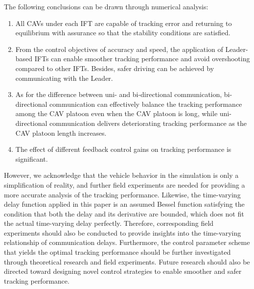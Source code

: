 \documentclass[a4paper]{cas-sc}
\begin{document}
The following conclusions can be drawn through numerical analysis:
\begin{enumerate}
  \item All CAVs under each IFT are capable of tracking error and returning to equilibrium with assurance so that the stability conditions are satisfied.
  \item From the control objectives of accuracy and speed, the application of Leader-based IFTs can enable smoother tracking performance and avoid overshooting compared to other IFTs. Besides, safer driving can be achieved by communicating with the Leader.
  \item As for the difference between uni- and bi-directional communication, bi-directional communication can effectively balance the tracking performance among the CAV platoon even when the CAV platoon is long, while uni-directional communication delivers deteriorating tracking performance as the CAV platoon length increases.
  \item The effect of different feedback control gains on tracking performance is significant.
\end{enumerate}

However, we acknowledge that the vehicle behavior in the simulation is only a simplification of reality, and further field experiments are needed for providing a more accurate analysis of the tracking performance. Likewise, the time-varying delay function applied in this paper is an assumed Bessel function satisfying the condition that both the delay and its derivative are bounded, which does not fit the actual time-varying delay perfectly. Therefore, corresponding field experiments should also be conducted to provide insights into the time-varying relationship of communication delays. Furthermore, the control parameter scheme that yields the optimal tracking performance should be further investigated through theoretical research and field experiments. Future research should also be directed toward designing novel control strategies to enable smoother and safer tracking performance.


\appendix
\end{document}
